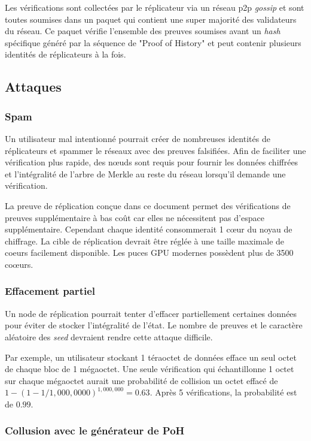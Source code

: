 \documentclass[12pt]{article}
\begin{document}
Les vérifications sont collectées par le réplicateur via un réseau p2p \textit{gossip} et sont toutes soumises dans un paquet qui contient une super majorité des validateurs du réseau. Ce paquet vérifie l'ensemble des preuves soumises avant un \textit{hash} spécifique généré par la séquence de "Proof of History" et peut contenir plusieurs identités de réplicateurs à la fois.
\subsection{Attaques}
\subsubsection{Spam}
Un utilisateur mal intentionné pourrait créer de nombreuses identités de réplicateurs et spammer le réseaux avec des preuves falsifiées. Afin de faciliter une vérification plus rapide, des nœuds sont requis pour fournir les données chiffrées et l'intégralité de l'arbre de Merkle au reste du réseau lorsqu'il demande une vérification.

La preuve de réplication conçue dans ce document permet des vérifications de preuves supplémentaire à bas coût car elles ne nécessitent pas d'espace supplémentaire. Cependant chaque identité consommerait 1 cœur du noyau de chiffrage. La cible de réplication devrait être réglée à une taille maximale de coeurs facilement disponible. Les puces GPU modernes possèdent plus de 3500 coœurs.

\subsubsection{Effacement partiel}

Un node de réplication pourrait tenter d'effacer partiellement certaines données pour éviter de stocker l'intégralité de l'état. Le nombre de preuves et le caractère aléatoire des \textit{seed} devraient rendre cette attaque difficile.

Par exemple, un utilisateur stockant 1 téraoctet de données efface un seul octet de chaque bloc de 1 mégaoctet. Une seule vérification qui échantillonne 1 octet sur chaque mégaoctet aurait une probabilité de collision un octet effacé de \(1 - (1- 1/1,000,0000)^{1,000,000} = 0.63\). Après 5 vérifications, la probabilité est de \(0.99\).

\subsubsection{Collusion avec le générateur de PoH}
\end{document}

